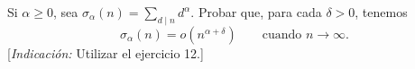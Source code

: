     \begin{ejercicio}
        Si $\alpha\geq0$, sea $\sigma_{\alpha}(n)=\sum_{d\mid n}d^{\alpha}$. Probar que, para
        cada $\delta>0$, tenemos
        \begin{equation*}
            \sigma_{\alpha}(n)=o(n^{\alpha+\delta})\qquad\text{cuando }n\to\infty.
        \end{equation*}
        [\textit{Indicación:} Utilizar el ejercicio 12.]
    \end{ejercicio}


